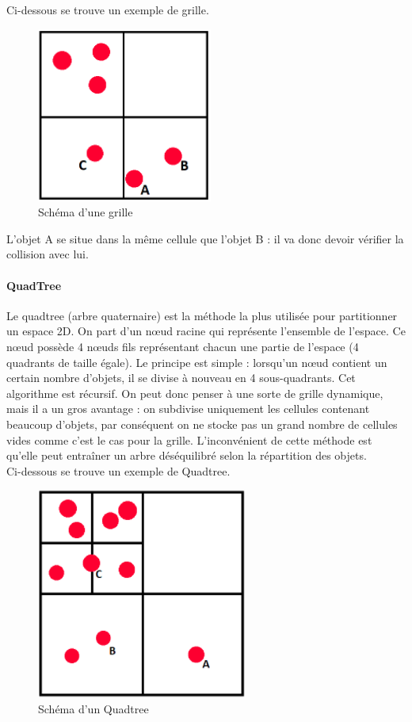 \documentclass{report}
\begin{document}
Ci-dessous se trouve un exemple de grille.

\begin{figure}[H]
\centering
\includegraphics[scale=0.6]{grid.PNG}
\caption{Schéma d'une grille}
\end{figure}

L’objet A se situe dans la même cellule que l’objet B : il va donc devoir vérifier la collision avec lui.

\paragraph{QuadTree}

Le quadtree (arbre quaternaire) est la méthode la plus utilisée pour partitionner un espace 2D. On part d’un nœud racine qui représente l’ensemble de l’espace. Ce nœud possède 4 nœuds fils représentant chacun une partie de l’espace (4 quadrants de taille égale). Le principe est simple : lorsqu’un nœud contient un certain nombre d’objets, il se divise à nouveau en 4 sous-quadrants. Cet algorithme est récursif. On peut donc penser à une sorte de grille dynamique, mais il a un gros avantage : on subdivise uniquement les cellules contenant beaucoup d’objets, par conséquent on ne stocke pas un grand nombre de cellules vides comme c’est le cas pour la grille. L’inconvénient de cette méthode est qu’elle peut entraîner un arbre déséquilibré selon la répartition des objets. \\

Ci-dessous se trouve un exemple de Quadtree.

\begin{figure}[H]
\centering
\includegraphics[scale=0.6]{quadtree.PNG}
\caption{Schéma d'un Quadtree}
\end{figure}
\end{document}
